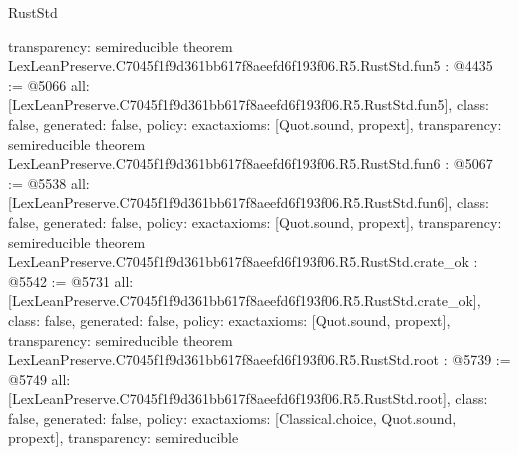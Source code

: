 \begin{lexlean}{RustStd}
\begin{coremodule}
{  transparency: semireducible
}
theorem LexLeanPreserve.C7045f1f9d361bb617f8aeefd6f193f06.R5.RustStd.fun5 : @4435 := @5066 {
  all: [LexLeanPreserve.C7045f1f9d361bb617f8aeefd6f193f06.R5.RustStd.fun5],
  class: false,
  generated: false,
  policy: exact{axioms: [Quot.sound, propext]},
  transparency: semireducible
}
theorem LexLeanPreserve.C7045f1f9d361bb617f8aeefd6f193f06.R5.RustStd.fun6 : @5067 := @5538 {
  all: [LexLeanPreserve.C7045f1f9d361bb617f8aeefd6f193f06.R5.RustStd.fun6],
  class: false,
  generated: false,
  policy: exact{axioms: [Quot.sound, propext]},
  transparency: semireducible
}
theorem LexLeanPreserve.C7045f1f9d361bb617f8aeefd6f193f06.R5.RustStd.crate_ok : @5542 := @5731 {
  all: [LexLeanPreserve.C7045f1f9d361bb617f8aeefd6f193f06.R5.RustStd.crate_ok],
  class: false,
  generated: false,
  policy: exact{axioms: [Quot.sound, propext]},
  transparency: semireducible
}
theorem LexLeanPreserve.C7045f1f9d361bb617f8aeefd6f193f06.R5.RustStd.root : @5739 := @5749 {
  all: [LexLeanPreserve.C7045f1f9d361bb617f8aeefd6f193f06.R5.RustStd.root],
  class: false,
  generated: false,
  policy: exact{axioms: [Classical.choice, Quot.sound, propext]},
  transparency: semireducible
}


\end{coremodule}
\end{lexlean}
